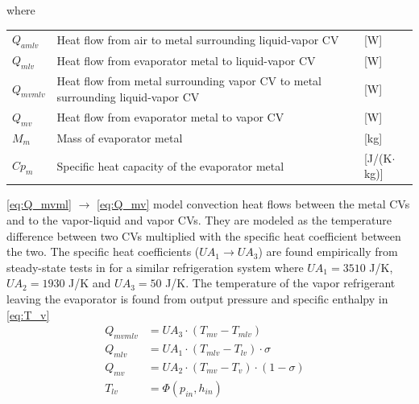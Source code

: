 where
\smallskip
\begin{center}
	\begin{tabular}{l p{10cm} l}
		$Q_{amlv}$  & Heat flow from air to metal surrounding liquid-vapor CV                                     & [\si{W}]                          \\
		$Q_{mlv}$   & Heat flow from evaporator metal to liquid-vapor CV                                          & [\si{W}]                          \\
		$Q_{mvmlv}$ & Heat flow from metal surrounding vapor CV to metal surrounding liquid-vapor CV & [\si{W}]                          \\
		$Q_{mv}$    & Heat flow from evaporator metal to vapor CV                                                 & [\si{W}]                          \\
		$M_{m} $    & Mass of evaporator metal                                                                    & [\si{kg}]                         \\
		$Cp_{m}$    & Specific heat capacity of the evaporator metal                                              & [\si{J}/(\si{K}$ \cdot $\si{kg})]
	\end{tabular}
\end{center}

\medskip
\cref{eq:Q_mvml} $\rightarrow$ \cref{eq:Q_mv} model convection heat flows between the metal CVs and to the vapor-liquid and vapor CVs. They are modeled as the temperature difference between two CVs multiplied with the specific heat coefficient between the two. The specific heat coefficients ($U A_1 \rightarrow U A_3$) are found empirically from steady-state tests in \cite{Sorensen2013} for a similar refrigeration system where $U A_1 = 3510$ \si{J}/\si{K}, $U A_2 = 1930$ \si{J}/\si{K} and $U A_3 = 50$ \si{J}/\si{K}. The temperature of the vapor refrigerant leaving the evaporator is found from output pressure and specific enthalpy in \cref{eq:T_v}
\begin{align}
	Q_{mvmlv} & = U A_3 \cdot (T_{mv} - T_{mlv}) \label{eq:Q_mvml}             &  \\
	Q_{mlv}   & = U A_1 \cdot (T_{mlv} - T_{lv}) \cdot \sigma	\label{eq:Q_ml}&  \\
	Q_{mv}    & = U A_2 \cdot (T_{mv} - T_v) \cdot (1- \sigma) \label{eq:Q_mv} &  \\
	T_{lv}    & = \Phi(p_{in}, h_{in}) \label{eq:T_v}                          &
\end{align}


